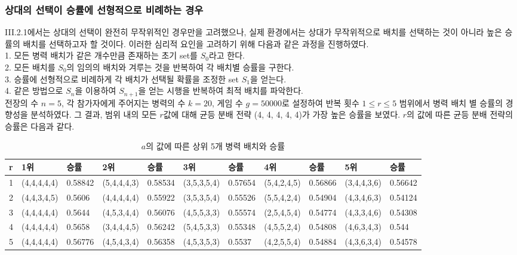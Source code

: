 \subsubsection{상대의 선택이 승률에 선형적으로 비례하는 경우}
III.2.1에서는 상대의 선택이 완전히 무작위적인 경우만을 고려했으나, 실제 환경에서는 상대가 무작위적으로 배치를 선택하는 것이 아니라 높은 승률의 배치를 선택하고자 할 것이다. 이러한 심리적 요인을 고려하기 위해 다음과 같은 과정을 진행하였다.\\
1. 모든 병력 배치가 같은 개수만큼 존재하는 초기 set를 $S_0$라고 한다.\\
2. 모든 배치를 $S_0$의 임의의 배치와 겨루는 것을 반복하여 각 배치별 승률을 구한다.\\
3. 승률에 선형적으로 비례하게 각 배치가 선택될 확률을 조정한 set $S_1$을 얻는다. \\
4. 같은 방법으로 $S_n$을 이용하여 $S_{n+1}$을 얻는 시행을 반복하여 최적 배치를 파악한다.\\
전장의 수 $n=5$, 각 참가자에게 주어지는 병력의 수 $k=20$, 게임 수 $g=50000$로 설정하여 반복 횟수 $1 \leq r \leq 5$ 범위에서 병력 배치 별 승률의 경향성을 분석하였다. 그 결과, 범위 내의 모든 $r$값에 대해 균등 분배 전략 (4, 4, 4, 4, 4)가 가장 높은 승률을 보였다. $r$의 값에 따른 균등 분배 전략의 승률은 다음과 같다.
\newpage
\begin{table}[htb]
    \centering
    \caption{$a$의 값에 따른 상위 5개 병력 배치와 승률}
    {\scriptsize
    \begin{tabular}{l|ll|ll|ll|ll|ll}
    r & 1위          & 승률      & 2위          & 승률      & 3위          & 승률      & 4위          & 승률      & 5위          & 승률      \\ \hline
    1 & (4,4,4,4,4) & 0.58842 & (5,4,4,4,3) & 0.58534 & (3,5,3,5,4) & 0.57654 & (5,4,2,4,5) & 0.56866 & (3,4,4,3,6) & 0.56642 \\
    2 & (4,4,3,4,5) & 0.5606  & (4,4,4,4,4) & 0.55922 & (3,5,3,5,4) & 0.55526 & (5,5,4,2,4) & 0.54904 & (4,3,4,6,3) & 0.54124 \\
    3 & (4,4,4,4,4) & 0.5644  & (4,5,3,4,4) & 0.56076 & (4,5,5,3,3) & 0.55574 & (2,5,4,5,4) & 0.54774 & (4,3,3,4,6) & 0.54308 \\
    4 & (4,4,4,4,4) & 0.5658  & (3,4,4,4,5) & 0.56242 & (5,4,5,3,3) & 0.55348 & (4,5,5,2,4) & 0.54808 & (4,6,3,4,3) & 0.544   \\
    5 & (4,4,4,4,4) & 0.56776 & (4,5,4,3,4) & 0.56358 & (4,5,3,5,3) & 0.5537  & (4,2,5,5,4) & 0.54884 & (4,3,6,3,4) & 0.54578
    \end{tabular}
    }
    \label{tab:my_label}
\end{table}
